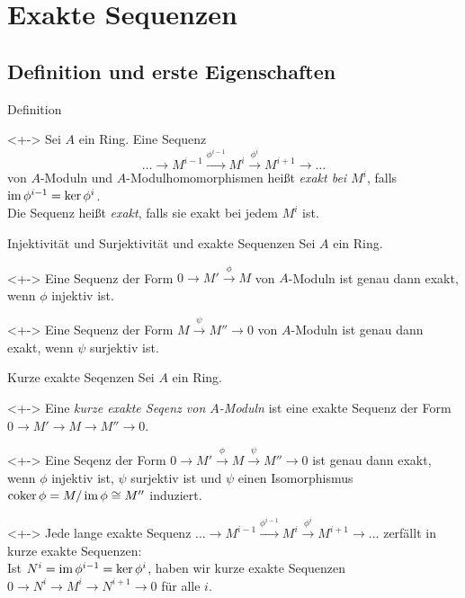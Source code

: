 \section{Exakte Sequenzen}

\subsection{Definition und erste Eigenschaften}

\begin{frame}{Definition}
	\begin{definition}<+->
		Sei \(A\) ein Ring.
		Eine Sequenz
		\[
			\dotsc \to M^{i - 1} \xrightarrow{\phi^{i - 1}} M^i \xrightarrow{\phi^i} M^{i + 1}
			\to \dotsc
		\]
		von \(A\)-Moduln und \(A\)-Modulhomomorphismen heißt \emph{exakt bei \(M^i\)}, falls
		\(\operatorname{im} \phi^{i - 1} = \ker \phi^i\).
		\\
		Die Sequenz heißt \emph{exakt}, falls sie exakt bei jedem \(M^i\) ist.
	\end{definition}
\end{frame}

\begin{frame}{Injektivität und Surjektivität und exakte Sequenzen}
	Sei \(A\) ein Ring.
	\begin{example}<+->
		Eine Sequenz der Form \(0 \to M' \xrightarrow\phi M\) von \(A\)-Moduln ist genau dann exakt,
		wenn \(\phi\) injektiv ist.
	\end{example}	
	\begin{example}<+->
		Eine Sequenz der Form \(M \xrightarrow{\psi} M'' \to 0\) von \(A\)-Moduln ist genau dann exakt,
		wenn \(\psi\) surjektiv ist.
	\end{example}
\end{frame}

\begin{frame}{Kurze exakte Seqenzen}
	Sei \(A\) ein Ring.
	\begin{definition}<+->
		Eine \emph{kurze exakte Seqenz von \(A\)-Moduln} ist eine exakte Sequenz der Form
		\(0 \to M' \to M \to M'' \to 0\).
	\end{definition}
	\begin{example}<+->
		Eine Seqenz der Form \(0 \to M' \xrightarrow\phi M \xrightarrow\psi M'' \to 0\) ist genau dann
		exakt, wenn \(\phi\) injektiv ist, \(\psi\) surjektiv ist und \(\psi\) einen Isomorphismus
		\(\operatorname{coker} \phi = M/\operatorname{im} \phi \cong M''\) induziert.
	\end{example}
	\begin{example}<+->
		Jede lange exakte Sequenz \(\dotsc \to M^{i - 1} \xrightarrow{\phi^{i - 1}} M^i
		\xrightarrow{\phi^i} M^{i + 1}	\to \dotsc\) zerfällt in kurze exakte Sequenzen:
		\\
		Ist \(N^i = \operatorname{im} \phi^{i - 1} = \ker \phi^i\), haben wir kurze exakte Sequenzen
		\(0 \to N^i \to M^i \to N^{i + 1} \to 0\) für alle \(i\).
	\end{example}
\end{frame}

